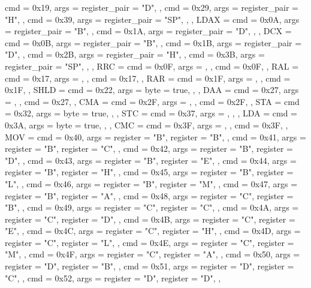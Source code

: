 {{        { cmd = 0x19, args = {{register_pair = "D"}}, },
        { cmd = 0x29, args = {{register_pair = "H"}}, },
        { cmd = 0x39, args = {{register_pair = "SP"}}, },
    },
    LDAX = {
        { cmd = 0x0A, args = {{register_pair = "B"}}, },
        { cmd = 0x1A, args = {{register_pair = "D"}}, },
    },
    DCX  = {
        { cmd = 0x0B, args = {{register_pair = "B"}}, },
        { cmd = 0x1B, args = {{register_pair = "D"}}, },
        { cmd = 0x2B, args = {{register_pair = "H"}}, },
        { cmd = 0x3B, args = {{register_pair = "SP"}}, },
    },
    RRC  = {
        { cmd = 0x0F, args = {}, },
        cmd = 0x0F,
    },
    RAL  = {
        { cmd = 0x17, args = {}, },
        cmd = 0x17,
    },
    RAR  = {
        { cmd = 0x1F, args = {}, },
        cmd = 0x1F,
    },
    SHLD = {
        { cmd = 0x22, args = {{byte = true}}, },
    },
    DAA  = {
        { cmd = 0x27, args = {}, },
        cmd = 0x27,
    },
    CMA  = {
        { cmd = 0x2F, args = {}, },
        cmd = 0x2F,
    },
    STA  = {
        { cmd = 0x32, args = {{byte = true}}, },
    },
    STC  = {
        { cmd = 0x37, args = {}, },
    },
    LDA  = {
        { cmd = 0x3A, args = {{byte = true}}, },
    },
    CMC  = {
        { cmd = 0x3F, args = {}, },
        cmd = 0x3F,
    },
    MOV  = {
        { cmd = 0x40, args = {{register = "B"}, {register = "B"}}, },
        { cmd = 0x41, args = {{register = "B"}, {register = "C"}}, },
        { cmd = 0x42, args = {{register = "B"}, {register = "D"}}, },
        { cmd = 0x43, args = {{register = "B"}, {register = "E"}}, },
        { cmd = 0x44, args = {{register = "B"}, {register = "H"}}, },
        { cmd = 0x45, args = {{register = "B"}, {register = "L"}}, },
        { cmd = 0x46, args = {{register = "B"}, {register = "M"}}, },
        { cmd = 0x47, args = {{register = "B"}, {register = "A"}}, },
        { cmd = 0x48, args = {{register = "C"}, {register = "B"}}, },
        { cmd = 0x49, args = {{register = "C"}, {register = "C"}}, },
        { cmd = 0x4A, args = {{register = "C"}, {register = "D"}}, },
        { cmd = 0x4B, args = {{register = "C"}, {register = "E"}}, },
        { cmd = 0x4C, args = {{register = "C"}, {register = "H"}}, },
        { cmd = 0x4D, args = {{register = "C"}, {register = "L"}}, },
        { cmd = 0x4E, args = {{register = "C"}, {register = "M"}}, },
        { cmd = 0x4F, args = {{register = "C"}, {register = "A"}}, },
        { cmd = 0x50, args = {{register = "D"}, {register = "B"}}, },
        { cmd = 0x51, args = {{register = "D"}, {register = "C"}}, },
        { cmd = 0x52, args = {{register = "D"}, {register = "D"}}, },
}}

